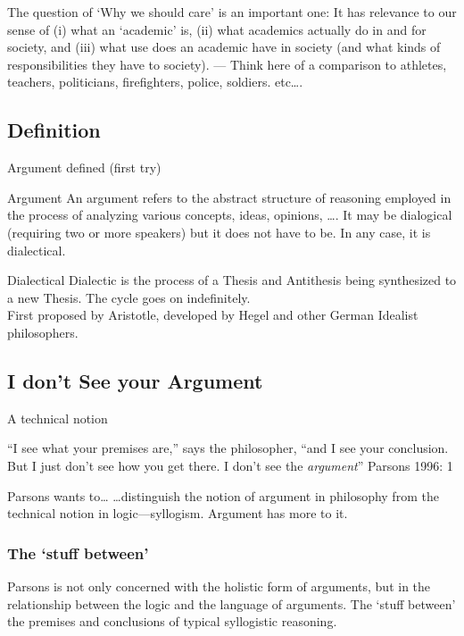 \documentclass{beamer}
\begin{document}
The question of `Why we should care' is an important one: It has relevance to our sense of (i) what an `academic' is, (ii) what academics actually do in and for society, and (iii) what use does an academic have in society (and what kinds of responsibilities they have to society). --- Think here of a comparison to athletes, teachers, politicians, firefighters, police, soldiers. etc\ldots.


\subsection{Definition}
\begin{frame}{Argument defined (first try)}
\begin{exampleblock}{\sc Argument}
An argument refers to the abstract structure of reasoning employed in the process of analyzing various concepts, ideas, opinions, \ldots. It may be dialogical (requiring two or more speakers) but it does not have to be. In any case, it is dialectical.
\end{exampleblock}
\begin{block}{Dialectical}
Dialectic is the process of a Thesis and Antithesis being synthesized to a new Thesis. The cycle goes on indefinitely.\\ First proposed by Aristotle, developed by Hegel and other German Idealist philosophers.
\end{block}
 \end{frame}\label{firsttry}


 
\subsection{I don't See your Argument}
\begin{frame}{A technical notion}
\begin{block}{}
``I see what your premises are,'' says the philosopher, ``and I see your conclusion.  But I just don't see how you get there.  I don't see the \textsl{argument}'' {Parsons 1996: 1}
\end{block}
\pause
\begin{block}{Parsons wants to\dots}
\ldots distinguish the notion of argument in philosophy from the technical notion in logic---syllogism. Argument has more \color{blue}{stuff} to it.  
\end{block} 
\end{frame}

\begin{frame}\frametitle{The `stuff between'}
Parsons is not only concerned with the holistic form of arguments, but in the relationship between the logic and the language of arguments. The `stuff between' the premises and conclusions of typical syllogistic reasoning.
\end{frame}
\end{document}
